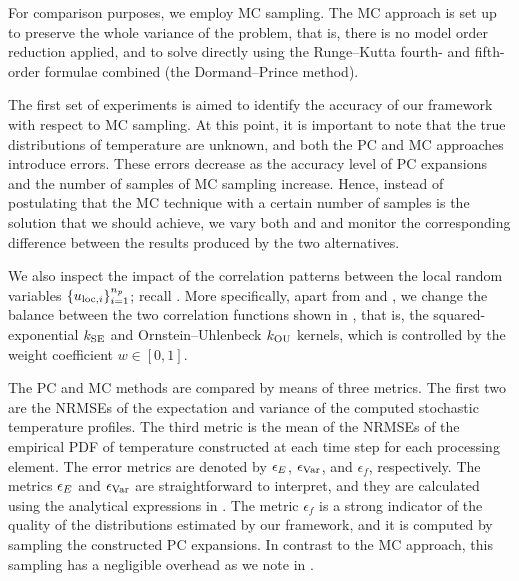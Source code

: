 For comparison purposes, we employ \ac{MC} sampling. The \ac{MC} approach is set
up to preserve the whole variance of the problem, that is, there is no model
order reduction applied, and to solve  directly
using the Runge--Kutta fourth- and fifth-order formulae combined (the
Dormand--Prince method).


The first set of experiments is aimed to identify the accuracy of our framework
with respect to \ac{MC} sampling. At this point, it is important to note that
the true distributions of temperature are unknown, and both the \ac{PC} and
\ac{MC} approaches introduce errors. These errors decrease as the accuracy level
\lc of \ac{PC} expansions and the number of samples \no of \ac{MC} sampling
increase. Hence, instead of postulating that the \ac{MC} technique with a
certain number of samples is the solution that we should achieve, we vary both
\lc and \no and monitor the corresponding difference between the results
produced by the two alternatives.

We also inspect the impact of the correlation patterns between the local random
variables $\{ u_{\mathrm{loc}, i} \}_{i = 1}^{n_{p}}$; recall .
More specifically, apart from \lc and \no, we change the balance between the two
correlation functions shown in , that is, the
squared-exponential $k_{\mathrm{SE}}$ and Ornstein--Uhlenbeck $k_{\mathrm{OU}}$ kernels, which is
controlled by the weight coefficient $w \in [0, 1]$.

The \ac{PC} and \ac{MC} methods are compared by means of three metrics. The
first two are the \acfp{NRMSE} of the expectation and variance of the computed
stochastic temperature profiles. The third metric is the mean of the \acp{NRMSE}
of the empirical \acf{PDF} of temperature constructed at each time step for each
processing element. The error metrics are denoted by $\epsilon_{\expectation}$,
$\epsilon_{\variance}$, and $\epsilon_f$, respectively. The metrics
$\epsilon_{\expectation}$ and $\epsilon_{\variance}$ are straightforward to
interpret, and they are calculated using the analytical expressions in
. The metric $\epsilon_f$ is a strong indicator of the
quality of the distributions estimated by our framework, and it is computed by
sampling the constructed \ac{PC} expansions. In contrast to the \ac{MC}
approach, this sampling has a negligible overhead as we note in
.

